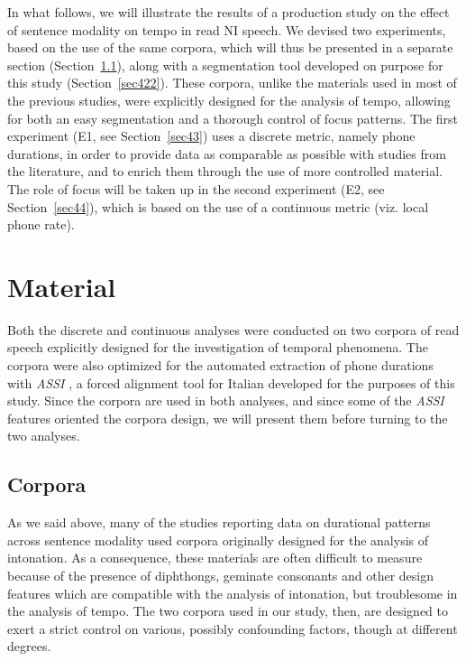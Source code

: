 In what follows, we will illustrate the results of a production study on the effect of sentence modality on tempo in read NI speech. We devised two experiments, based on the use of the same corpora, which will thus be presented in a separate section (Section~\ref{sec421}), along with a segmentation tool developed on purpose for this study (Section~\ref{sec422}). These corpora, unlike the materials used in most of the previous studies, were explicitly designed for the analysis of tempo, allowing for both an easy segmentation and a thorough control of focus patterns. The first experiment (E1, see Section~\ref{sec43}) uses a discrete metric, namely phone durations, in order to provide data as comparable as possible with studies from the literature, and to enrich them through the use of more controlled material. The role of focus will be taken up in the second experiment (E2, see Section~\ref{sec44}), which is based on the use of a continuous metric (viz. local phone rate).

\section{Material}\label{sec42}
Both the discrete and continuous analyses were conducted on two corpora of read speech explicitly designed for the investigation of temporal phenomena. The corpora were also optimized for the automated extraction of phone durations with \textit{ASSI} \citep{cangemi2011automatic}, a forced alignment tool for Italian developed for the purposes of this study. Since the corpora are used in both analyses, and since some of the \textit{ASSI} features oriented the corpora design, we will present them before turning to the two analyses.

\subsection{Corpora}\label{sec421}
As we said above, many of the studies reporting data on durational patterns across sentence modality used corpora originally designed for the analysis of intonation. As a consequence, these materials are often difficult to measure because of the presence of diphthongs, geminate consonants and other design features which are compatible with the analysis of intonation, but troublesome in the analysis of tempo. The two corpora used in our study, then, are designed to exert a strict control on various, possibly confounding factors, though at different degrees.

